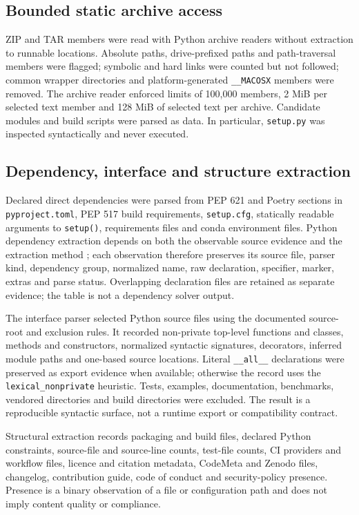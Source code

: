 \documentclass[10pt,a4paper]{article}
\newcommand{\code}[1]{\texttt{#1}}
\begin{document}
\subsection{Bounded static archive access}

ZIP and TAR members were read with Python archive readers without extraction to runnable locations. Absolute paths, drive-prefixed paths and path-traversal members were flagged; symbolic and hard links were counted but not followed; common wrapper directories and platform-generated \code{\_\_MACOSX} members were removed. The archive reader enforced limits of 100,000 members, 2 MiB per selected text member and 128 MiB of selected text per archive. Candidate modules and build scripts were parsed as data. In particular, \code{setup.py} was inspected syntactically and never executed.

\subsection{Dependency, interface and structure extraction}

Declared direct dependencies were parsed from PEP 621 and Poetry sections in \code{pyproject.toml}, PEP 517 build requirements, \code{setup.cfg}, statically readable arguments to \code{setup()}, requirements files and conda environment files. Python dependency extraction depends on both the observable source evidence and the extraction method \cite{jin2024pyanalyzer}; each observation therefore preserves its source file, parser kind, dependency group, normalized name, raw declaration, specifier, marker, extras and parse status. Overlapping declaration files are retained as separate evidence; the table is not a dependency solver output.

The interface parser selected Python source files using the documented source-root and exclusion rules. It recorded non-private top-level functions and classes, methods and constructors, normalized syntactic signatures, decorators, inferred module paths and one-based source locations. Literal \code{\_\_all\_\_} declarations were preserved as export evidence when available; otherwise the record uses the \code{lexical\_nonprivate} heuristic. Tests, examples, documentation, benchmarks, vendored directories and build directories were excluded. The result is a reproducible syntactic surface, not a runtime export or compatibility contract.

Structural extraction records packaging and build files, declared Python constraints, source-file and source-line counts, test-file counts, CI providers and workflow files, licence and citation metadata, CodeMeta and Zenodo files, changelog, contribution guide, code of conduct and security-policy presence. Presence is a binary observation of a file or configuration path and does not imply content quality or compliance.
\end{document}
